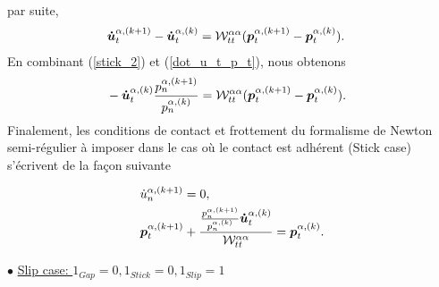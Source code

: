\noindent par suite, 
\begin{align}
&\boldsymbol{\dot{u}}^{\alpha,(k+1)}_t - \boldsymbol{\dot{u}}^{\alpha,(k)}_t = {\cal W}^{\alpha \alpha}_{tt} (\boldsymbol{p}^{\alpha,(k+1)}_t - \boldsymbol{p}^{\alpha,(k)}_t).\label{dot_u_t_p_t}
\end{align}
\noindent En combinant (\ref{stick_2}) et (\ref{dot_u_t_p_t}), nous obtenons
\begin{align}
&- \boldsymbol{\dot{u}}^{\alpha,(k)}_t \frac{p^{\alpha,(k+1)}_n}{p^{\alpha,(k)}_n} = {\cal W}^{\alpha \alpha}_{tt} (\boldsymbol{p}^{\alpha,(k+1)}_t - \boldsymbol{p}^{\alpha,(k)}_t).
\end{align}
\noindent Finalement, les conditions de contact et frottement du formalisme de Newton semi-régulier à imposer dans le cas où le contact est adhérent (Stick case) s'écrivent de la façon suivante

\begin{align}
&\dot{u}^{\alpha,(k+1)}_n=0, \\
&\boldsymbol{p}_{t}^{\alpha,(k+1)} + \frac{\frac{p^{\alpha,(k+1)}_n}{p^{\alpha,(k)}_n}\boldsymbol{\dot{u}}^{\alpha,(k)}_t}{{\cal W}^{\alpha \alpha}_{tt}} = \boldsymbol{p}_{t}^{\alpha,(k)}.
\end{align}

 $\bullet$ \underline{Slip case: ${1}_{Gap} =0, {1}_{Stick} = 0, {1}_{Slip} = 1$}

